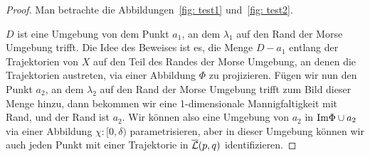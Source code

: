 \begin{proof}
    Man betrachte die Abbildungen~\ref{fig: test1} und~\ref{fig: test2}.

    $D$ ist eine Umgebung von dem Punkt $a_1$, an dem $\lambda_1$ auf den Rand der Morse Umgebung 
    trifft. Die Idee des Beweises ist es, die Menge $D - a_1$ entlang der Trajektorien von $X$ auf den 
    Teil des Randes der Morse Umgebung, an denen die Trajektorien austreten, via einer Abbildung $\Phi$ 
    zu projizieren. Fügen wir nun den Punkt $a_2$, an dem $\lambda_2$ auf den Rand der Morse Umgebung 
    trifft zum Bild dieser Menge hinzu, dann bekommen wir eine 1-dimensionale Mannigfaltigkeit mit Rand, 
    und der Rand ist $a_2$. Wir können also eine Umgebung von $a_2$ in ${ \operatorname{Im} } \Phi \cup a_2$ via einer
    Abbildung $\chi \colon [0, \delta)$ parametrisieren, aber in dieser Umgebung können wir auch jeden 
    Punkt mit einer Trajektorie in ${\overline{\mathcal{L}} } (p, q)$ identifizieren.
\end{proof}

